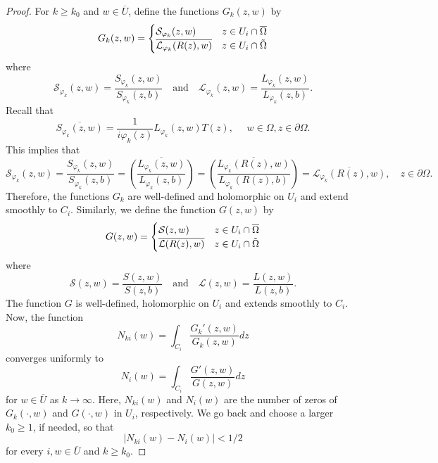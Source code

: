 \documentclass[11pt, reqno]{amsart}
\numberwithin{equation}{section}
\newcommand{\ov}{\overline}
\newcommand{\Om}{\Omega}
\begin{document}
\begin{proof}
		\medskip
		
		For $k\geq k_0$ and $w\in \ov{U}$, define the functions $G_k(z,w)$ by
		\begin{equation}
		G_k(z,w)
		=
		\begin{cases}
			\mathcal{S}_{\varphi_k}(z,w)& z\in U_i\cap \overline{\Omega}
			\\
			\overline{\mathcal{L}_{\varphi_k}(R(z),w)}& z\in U_i\cap \Tilde{\Omega}
		\end{cases}
		\end{equation}
		where 
		\begin{equation}
		\mathcal{S}_{\varphi_k}(z,w) = \frac{S_{\varphi_k}(z,w)}{S_{\varphi_k}(z,b)}
		\quad
		\text{and}
		\quad
		\mathcal{L}_{\varphi_k}(z,w) = \frac{L_{\varphi_k}(z,w)}{L_{\varphi_k}(z,b)}.
		\end{equation}
		Recall that
		\[
			\overline{S_{\varphi_k}(z,w)} = \frac{1}{i\varphi_k(z)}L_{\varphi_k}(z,w)T(z),
			\quad\,\,
			w\in\Om, z\in\partial\Omega.
		\]
		This implies that
		\[
		\mathcal{S}_{\varphi_k}(z,w)
		=
		\frac{S_{\varphi_k}(z,w)}{S_{\varphi_k}(z,b)}
		=
		\overline{\left(\frac{L_{\varphi_k}(z,w)}{L_{\varphi_k}(z,b)}\right)}
		=
		\overline{\left(\frac{L_{\varphi_k}(R(z),w)}{L_{\varphi_k}(R(z),b)}\right)}
		=
		\overline{\mathcal{L}_{\varphi_k}(R(z),w)},
		\quad
		z\in\partial\Om.
		\]
		Therefore, the functions $G_k$ are well-defined and holomorphic on $U_i$ and extend smoothly to $C_i$. Similarly, we define the function $G(z,w)$ by
		\begin{equation}
		G(z,w)
		=
		\begin{cases}
			\mathcal{S}(z,w)& z\in U_i\cap \overline{\Omega}
			\\
			\overline{\mathcal{L}(R(z),w)}& z\in U_i\cap \Tilde{\Omega}
		\end{cases}
		\end{equation}
		where 
		\begin{equation}
		\mathcal{S}(z,w) = \frac{S(z,w)}{S(z,b)}
		\quad
		\text{and}
		\quad
		\mathcal{L}(z,w) = \frac{L(z,w)}{L(z,b)}.
		\end{equation}
		The function $G$ is well-defined, holomorphic on $U_i$ and extends smoothly to $C_i$. 
		Now, the function 
		\begin{equation}
		N_{ki}(w) = \int_{C_i} \frac{{G_k}'(z, w)}{G_k(z,w)} dz
		\end{equation}
		converges uniformly to 
		\begin{equation}
		N_i(w)=\int_{C_i}  \frac{{G}'(z, w)}{G(z,w)} dz
		\end{equation}
		for $w\in \overline{U}$ as $k\rightarrow\infty$. Here, $N_{ki}(w)$ and $N_i(w)$ are the number of zeros of $G_k(\cdot, w)$ and $G(\cdot,w)$ in $U_i$, respectively. We go back and choose a larger $k_0 \ge 1$, if needed, so that
		\[
		\vert N_{ki}(w) - N_i(w)\vert < 1/2
        \]
		for every $i,w\in \overline{U}$ and $k\geq k_0$.


\end{proof}
\end{document}
